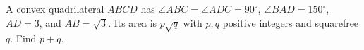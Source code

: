 A convex quadrilateral $ABCD$ has $\angle ABC=\angle ADC=90^\circ$, $\angle BAD=150^\circ$, $AD=3$, and $AB=\sqrt3$. Its area is $p\sqrt q$ with $p,q$ positive integers and squarefree $q$. Find $p+q$.

